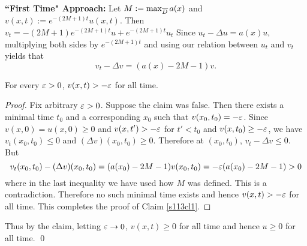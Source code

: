\noindent \textbf{``First Time" Approach:} Let $M := \max_{\overline{D}}a(x)$ and $v(x, t) := e^{-(2M + 1)t}u(x, t)$. Then $v_{t} = -(2M + 1)e^{-(2M + 1)t}u + e^{-(2M + 1)t}u_{t}$
Since $u_{t} - \Delta u = a(x)u$, multiplying both sides by $e^{-(2M + 1)t}$ and using our relation between $u_{t}$ and $v_{t}$ yields
that $$v_{t} - \Delta v = (a(x) - 2M - 1)v.$$
\begin{claim}\label{s113cl1}
For every $\varepsilon > 0$, $v(x, t) > -\varepsilon$ for all time.
\end{claim}
\begin{proof}
Fix arbitrary $\varepsilon > 0$. Suppose the claim was false. Then there exists a minimal time $t_{0}$ and a corresponding $x_{0}$ such that $v(x_{0}, t_{0}) = -\varepsilon$. Since
$v(x, 0) = u(x, 0) \geq 0$ and $v(x, t') > -\varepsilon$ for $t' < t_{0}$ and $v(x, t_{0}) \geq -\varepsilon$, we have $v_{t}(x_{0}, t_{0}) \leq 0$ and $(\Delta v)(x_{0}, t_{0}) \geq 0$.
Therefore at $(x_{0}, t_{0})$, $v_{t} - \Delta v \leq 0$. But
$$v_{t}(x_{0}, t_{0}) - (\Delta v)(x_{0}, t_{0}) = (a(x_{0}) - 2M - 1)v(x_{0}, t_{0}) = -\varepsilon(a(x_{0}) - 2M - 1) > 0$$
where in the last inequality we have used how $M$ was defined. This is a contradiction. Therefore no such minimal time exists
and hence $v(x, t) > -\varepsilon$ for all time. This completes the proof of Claim \ref{s113cl1}.
\end{proof}
Thus by the claim, letting $\varepsilon \rightarrow 0$, $v(x, t) \geq 0$ for all time and hence $u \geq 0$ for all time. \hfill\qed

